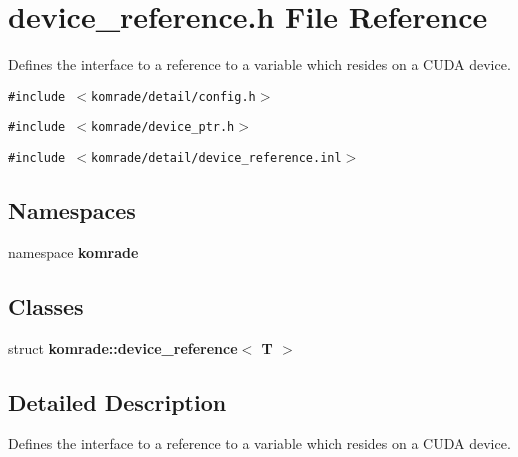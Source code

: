 \section{device\_\-reference.h File Reference}
\label{device__reference_8h}
Defines the interface to a reference to a variable which resides on a CUDA device. 

{\tt \#include $<$komrade/detail/config.h$>$}\par
{\tt \#include $<$komrade/device\_\-ptr.h$>$}\par
{\tt \#include $<$komrade/detail/device\_\-reference.inl$>$}\par
\subsection*{Namespaces}
\begin{CompactItemize}
\item 
namespace {\bf komrade}
\end{CompactItemize}
\subsection*{Classes}
\begin{CompactItemize}
\item 
struct {\bf komrade::device\_\-reference$<$ T $>$}
\end{CompactItemize}


\subsection{Detailed Description}
Defines the interface to a reference to a variable which resides on a CUDA device. 


